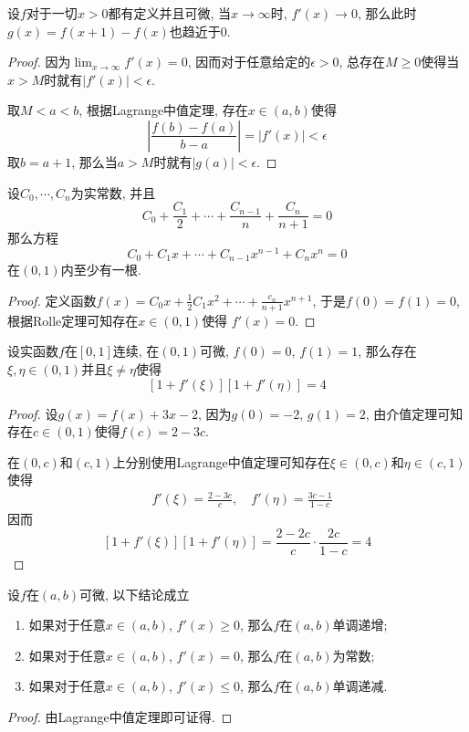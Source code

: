 \documentclass[cn,12pt,math=mtpro2,citestyle=gb7714-2015,bibstyle=gb7714-2015,twocol]{elegantbook}
\begin{document}
\begin{example}
设$f$对于一切$x>0$都有定义并且可微, 当$x\to\infty$时, $f'(x)\to0$, 那么此时$g(x)=f(x+1)-f(x)$也趋近于0.
\end{example}
\begin{proof}
  因为$\displaystyle\lim_{x\to\infty}f'(x)=0$, 因而对于任意给定的$\epsilon>0$, 总存在$M\geq0$使得当$x>M$时就有$|f'(x)|<\epsilon$.

  取$M<a<b$, 根据Lagrange中值定理, 存在$x\in (a,b)$使得
  $$\left|\frac{f(b)-f(a)}{b-a}\right|=|f'(x)|<\epsilon$$
  取$b=a+1$, 那么当$a>M$时就有$|g(a)|<\epsilon$.
\end{proof}
\begin{example}
设$C_0,\cdots,C_n$为实常数, 并且
$$C_0+\frac{C_1}{2}+\cdots+\frac{C_{n-1}}{n}+\frac{C_n}{n+1}=0$$
那么方程
$$C_0+C_1x+\cdots+C_{n-1}x^{n-1}+C_nx^n=0$$
在$(0,1)$内至少有一根.
\end{example}
\begin{proof}
  定义函数$\displaystyle f(x)=C_0x+\frac{1}{2}C_1x^2+\cdots+\frac{c_n}{n+1}x^{n+1}$, 于是$f(0)=f(1)=0$, 根据Rolle定理可知存在$x\in(0,1)$使得
  $f'(x)=0$.
\end{proof}
\begin{example}
设实函数$f$在$[0,1]$连续, 在$(0,1)$可微, $f(0)=0$, $f(1)=1$, 那么存在$\xi,\eta\in(0,1)$并且$\xi\neq \eta$使得
$$[1+f'(\xi)][1+f'(\eta)]=4$$
\end{example}
\begin{proof}
  设$g(x)=f(x)+3x-2$, 因为$g(0)=-2$, $g(1)=2$, 由介值定理可知存在$c\in(0,1)$使得$f(c)=2-3c$.

  在$(0,c)$和$(c,1)$上分别使用Lagrange中值定理可知存在$\xi\in(0,c)$和$\eta\in(c,1)$使得
  \begin{align*}
  &f'(\xi)=\frac{2-3c}{c},\quad f'(\eta)=\frac{3c-1}{1-c}
  \end{align*}
  因而
  $$[1+f'(\xi)][1+f'(\eta)]=\frac{2-2c}{c}\cdot\frac{2c}{1-c}=4$$
\end{proof}
\begin{theorem}\label{thm:th5.4}
  设$f$在$(a,b)$可微, 以下结论成立
  \begin{enumerate}[label=(\arabic*)]
  \item 如果对于任意$x\in(a,b)$, $f'(x)\geq 0$, 那么$f$在$(a,b)$单调递增;

  \item 如果对于任意$x\in(a,b)$, $f'(x)= 0$, 那么$f$在$(a,b)$为常数;

  \item 如果对于任意$x\in(a,b)$, $f'(x)\leq 0$, 那么$f$在$(a,b)$单调递减.
  \end{enumerate}
\end{theorem}
\begin{proof}
  由Lagrange中值定理即可证得.
\end{proof}
\end{document}
